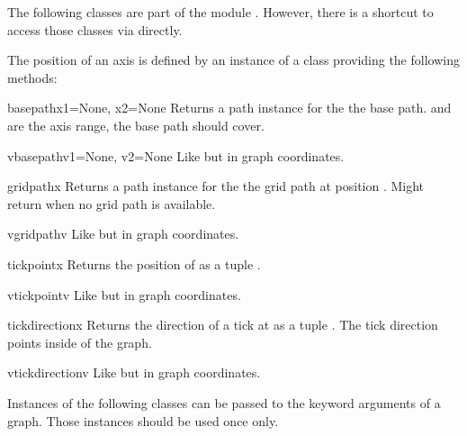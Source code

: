 The following classes are part of the module .
However, there is a shortcut to access those classes via
 directly.

The position of an axis is defined by an instance of a class providing
the following methods:

\begin{methoddesc}[axispos]{basepath}{x1=None, x2=None}
  Returns a path instance for the the base path.  and 
  are the axis range, the base path should cover.
\end{methoddesc}

\begin{methoddesc}[axispos]{vbasepath}{v1=None, v2=None}
  Like  but in graph coordinates.
\end{methoddesc}

\begin{methoddesc}[axispos]{gridpath}{x}
  Returns a path instance for the the grid path at position .
  Might return  when no grid path is available.
\end{methoddesc}

\begin{methoddesc}[axispos]{vgridpath}{v}
  Like  but in graph coordinates.
\end{methoddesc}

\begin{methoddesc}[axispos]{tickpoint}{x}
  Returns the position of  as a tuple .
\end{methoddesc}

\begin{methoddesc}[axispos]{vtickpoint}{v}
  Like  but in graph coordinates.
\end{methoddesc}

\begin{methoddesc}[axispos]{tickdirection}{x}
  Returns the direction of a tick at  as a tuple .
  The tick direction points inside of the graph.
\end{methoddesc}

\begin{methoddesc}[axispos]{vtickdirection}{v}
  Like  but in graph coordinates.
\end{methoddesc}

Instances of the following classes can be passed to the 
keyword arguments of a graph. Those instances should be used once
only.

